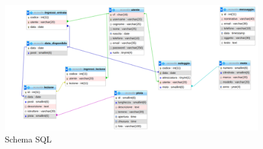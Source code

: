 \begin{figure}[H]
    \includegraphics[scale=0.4]{./res/schemaSQL.pdf}
    \centering
    \caption{Schema SQL}
\end{figure}
